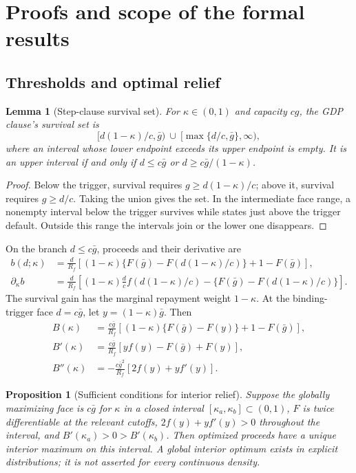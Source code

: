 \documentclass[11pt]{article}
\newtheorem{lemma}{Lemma}
\newtheorem{proposition}{Proposition}
\begin{document}


\section{Proofs and scope of the formal results}\label{app:proofs}
\subsection{Thresholds and optimal relief}
\begin{lemma}[Step-clause survival set]\label{lem:threshold}
For $\kappa\in(0,1)$ and capacity $cg$, the GDP clause's survival set is
\[
 [d(1-\kappa)/c,\bar g)\ \cup\ [\max\{d/c,\bar g\},\infty),
\]
where an interval whose lower endpoint exceeds its upper endpoint is empty. It is an upper interval if and only if $d\le c\bar g$ or $d\ge c\bar g/(1-\kappa)$.
\end{lemma}
\begin{proof}
Below the trigger, survival requires $g\ge d(1-\kappa)/c$; above it, survival requires $g\ge d/c$. Taking the union gives the set. In the intermediate face range, a nonempty interval below the trigger survives while states just above the trigger default. Outside this range the intervals join or the lower one disappears.
\end{proof}
On the branch $d\le c\bar g$, proceeds and their derivative are
\begin{align}
 b(d;\kappa)&=\frac d{R_f}\left[(1-\kappa)\{F(\bar g)-F(d(1-\kappa)/c)\}+1-F(\bar g)\right],\label{eq:closed}\\
 \partial_\kappa b&=\frac d{R_f}\left[(1-\kappa)\frac dc f(d(1-\kappa)/c)
                    -\{F(\bar g)-F(d(1-\kappa)/c)\}\right].\label{eq:derivative}
\end{align}
The survival gain has the marginal repayment weight $1-\kappa$. At the binding-trigger face $d=c\bar g$, let $y=(1-\kappa)\bar g$. Then
\begin{align}
 B(\kappa)&=\frac{c\bar g}{R_f}\left[(1-\kappa)\{F(\bar g)-F(y)\}+1-F(\bar g)\right],\label{eq:boundary}\\
 B'(\kappa)&=\frac{c\bar g}{R_f}[yf(y)-F(\bar g)+F(y)],\nonumber\\
 B''(\kappa)&=-\frac{c\bar g^2}{R_f}[2f(y)+yf'(y)].\nonumber
\end{align}
\begin{proposition}[Sufficient conditions for interior relief]\label{prop:interior}
Suppose the globally maximizing face is $c\bar g$ for $\kappa$ in a closed interval $[\kappa_a,\kappa_b]\subset(0,1)$, $F$ is twice differentiable at the relevant cutoffs, $2f(y)+yf'(y)>0$ throughout the interval, and $B'(\kappa_a)>0>B'(\kappa_b)$. Then optimized proceeds have a unique interior maximum on this interval. A global interior optimum exists in explicit distributions; it is not asserted for every continuous density.
\end{proposition}
\end{document}
